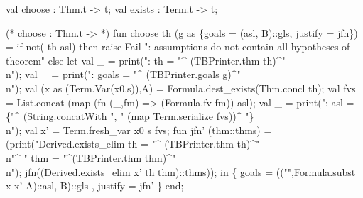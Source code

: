\nwenddocs{}\plusendmoddef\nwstartdeflinemarkup{}\nwenddeflinemarkup
val choose : Thm.t -> t;
val exists : Term.t -> t;
\nwendcode{}\nwdocspar

\nwenddocs{}\plusendmoddef\nwstartdeflinemarkup{}\nwenddeflinemarkup
(* choose : Thm.t ->  *)
fun choose th (g as \{goals = (asl, B)::gls, justify = jfn\}) =
  if not( th asl)
  then raise Fail ": assumptions do not contain all hypotheses of theorem"
  else
    let
      val _ = print(": th = "^
                    (TBPrinter.thm th)^"\\n");
      val _ = print(": goals = "^
                    (TBPrinter.goals g)^"\\n");
      val (x as (Term.Var(x0,s)),A) = Formula.dest_exists(Thm.concl th);
      val fvs = List.concat (map (fn (_,fm) =>
                                     (Formula.fv fm))
                                 asl);
      val _ = print(": asl = \{"^
                    (String.concatWith ", " (map Term.serialize fvs))^
                    "\}\\n");
      val x' = Term.fresh_var x0 s fvs;
      fun jfn' (thm::thms) =
        (print("Derived.exists_elim th = "^
               (TBPrinter.thm th)^"\\n"^
               "                   thm = "^(TBPrinter.thm thm)^"\\n");
         jfn((Derived.exists_elim x' th thm)::thms));
    in
      \{ goals = (("",Formula.subst x x' A)::asl, B)::gls
      , justify = jfn' \}
    end;

